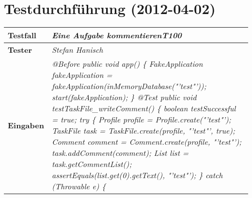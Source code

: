 
\chapter{Testdurchführung (2012-04-02)}



\begin{longtable}{|p{4cm}|p{11cm}|}
\hline
\textbf{Testfall} & \textit{Eine Aufgabe kommentieren\textbf{T100}} \\
\hline
\textbf{Tester} & \textit{Stefan Hanisch} \\
\hline
\textbf{Eingaben} & \textit{@Before \newline
public void app() \{ \newline
\hspace*{1mm}FakeApplication fakeApplication \newline
\hspace*{4mm}= fakeApplication(inMemoryDatabase("'test"'));\newline
\hspace*{1mm}start(fakeApplication); \newline
\} \newline
\newline
@Test \newline
public void testTaskFile\_writeComment() \{\newline
\hspace*{1mm}boolean testSuccessful = true; \newline
\hspace*{1mm}try \{\newline
\hspace*{3mm}Profile profile = Profile.create("'test"');\newline
\hspace*{3mm}TaskFile task = TaskFile.create(profile, "'test"', true);\newline
\hspace*{3mm}Comment comment = Comment.create(profile, "'test"');\newline
\hspace*{3mm}task.addComment(comment);\newline
\hspace*{3mm}List list = task.getCommentList();\newline
\hspace*{3mm}assertEquals(list.get(0).getText(), "'test"');\newline
\hspace*{1mm}\} catch (Throwable e) \{ \newline
}
\end{longtable}
